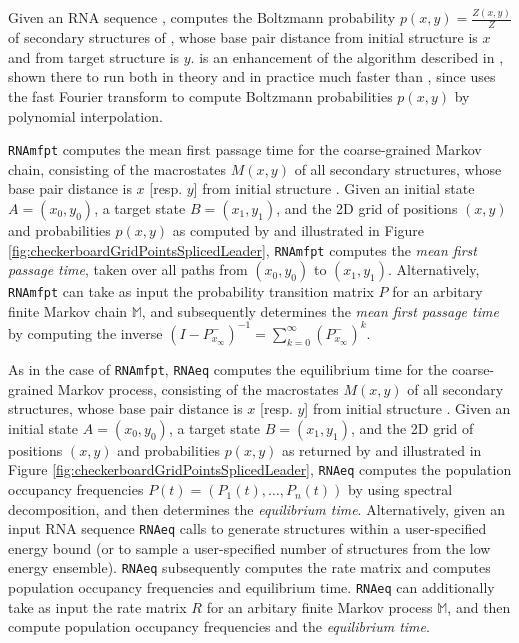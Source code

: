 Given an RNA sequence \seq,  \ffttwo computes the Boltzmann probability
$p(x,y) = \frac{Z(x,y)}{Z}$ of secondary structures of \seq, whose base
pair distance from initial structure \strA is $x$ and from target structure
\strB is $y$. \ffttwo is an enhancement of the algorithm
described in \cite{Senter.jmb14}, shown there
to run both in theory and in practice much faster than \rnatwofold
\cite{hofacker:RNAbor2D},
since \ffttwo uses the fast Fourier transform to
compute Boltzmann probabilities $p(x,y)$ by polynomial interpolation.


{\tt RNAmfpt} computes the mean first passage time for the
coarse-grained Markov chain,
consisting of the macrostates $M(x,y)$ of all secondary structures,
whose base pair distance is $x$ [resp. $y$] from initial structure .
Given an initial state $A=(x_0,y_0)$, a
target state $B=(x_1,y_1)$, and the 2D grid of positions $(x,y)$
and probabilities $p(x,y)$ as computed by \ffttwo and
illustrated in
Figure \ref{fig:checkerboardGridPointsSplicedLeader},
{\tt RNAmfpt} computes the {\em mean first passage time}, taken
over all paths from $(x_0,y_0)$ to  $(x_1,y_1)$.  Alternatively,
{\tt RNAmfpt} can take as input the probability transition matrix $P$ for
an arbitary finite Markov chain $\mathbb{M}$, and subsequently
determines the {\em mean first passage time} by computing the inverse
$(I - P^{-}_{x_{\infty}})^{-1} = \displaystyle\sum_{k=0}^{\infty}
(P^{-}_{x_{\infty}})^k$.


As in the case of {\tt RNAmfpt}, {\tt RNAeq}
computes the equilibrium time for the coarse-grained Markov process,
consisting of the macrostates $M(x,y)$ of all secondary structures,
whose base pair distance is $x$ [resp. $y$] from initial structure .
Given an initial state $A=(x_0,y_0)$, a
target state $B=(x_1,y_1)$, and the 2D grid of positions $(x,y)$
and probabilities $p(x,y)$ as returned by \ffttwo and
illustrated in
Figure \ref{fig:checkerboardGridPointsSplicedLeader},
{\tt RNAeq} computes the population occupancy frequencies
$P(t) = (P_1(t),\ldots,P_n(t))$ by using spectral decomposition, and
then determines the {\em equilibrium time}.
Alternatively, given an input RNA sequence {\tt RNAeq}
calls \rnasub \cite{wuchtyFontanaHofackerSchuster} to generate
structures within a user-specified energy bound (or to sample a user-specified
number of structures from the low energy ensemble). {\tt RNAeq} subsequently
computes the rate matrix and computes population occupancy frequencies
and equilibrium time. {\tt RNAeq} can additionally
take as input the rate matrix $R$ for
an arbitary finite Markov process $\mathbb{M}$, and then
compute population occupancy frequencies
and the {\em equilibrium time}.

